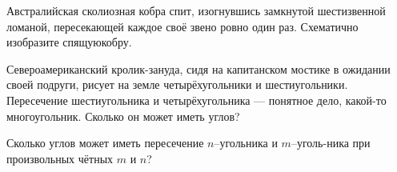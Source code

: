 ﻿

\begin{itemize}
 Австралийская сколиозная кобра спит, изогнувшись замкнутой шестизвенной ломаной, пересекающей каждое своё звено ровно один раз. Схематично изобразите спящую\linebreak кобру.

\itB Североамериканский кролик-зануда, сидя на капитанском мостике в ожидании своей подруги, рисует на земле четырёхугольники и шестиугольники. Пересечение шестиугольника и четырёхугольника — понятное дело, какой-то многоугольник. Сколько он может иметь углов?

\itC Сколько углов может иметь пересечение $n$--угольника и $m$--уголь-\linebreak ника при произвольных чётных $m$ и $n$?
\end{itemize}